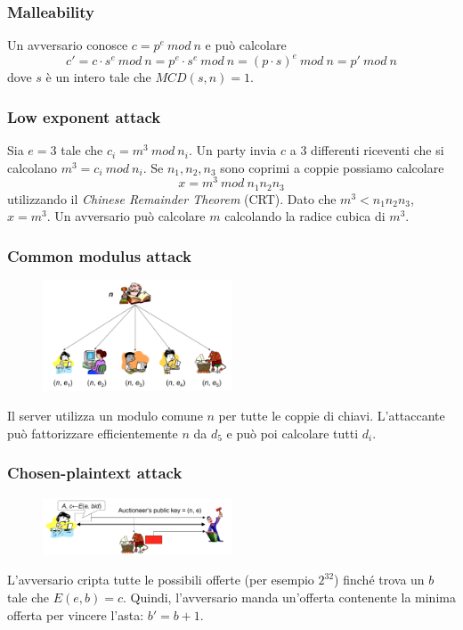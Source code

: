 \documentclass[a4paper,12pt]{article}
\begin{document}
\subsubsection{Malleability}
Un avversario conosce $c = p^e\ mod\ n$ e può calcolare
$$ c' = c \cdot s^e\ mod\ n = p^e \cdot s^e\ mod\ n = (p \cdot s)^e\ mod\ n = p'\ mod\ n $$
dove $s$ è un intero tale che $MCD(s, n) = 1$.

\subsubsection{Low exponent attack}
Sia $e = 3$ tale che $c_i = m^3\ mod\ n_i$.
Un party invia $c$ a 3 differenti riceventi che si calcolano $m^3 = c_i\ mod\ n_i$.
Se $n_1, n_2, n_3$ sono coprimi a coppie possiamo calcolare
$$ x = m^3\ mod\ n_1n_2n_3$$ 
utilizzando il \textit{Chinese Remainder Theorem} (CRT).
Dato che $m^3 < n_1n_2n_3$, $x = m^3$. Un avversario può calcolare $m$ calcolando la radice cubica di $m^3$.

\subsubsection{Common modulus attack}

\begin{figure}[H]
  \centering
  \includegraphics[width=0.5\textwidth]{img/common-modulus-attack}
\end{figure}
Il server utilizza un modulo comune $n$ per tutte le coppie di chiavi.
L'attaccante può fattorizzare efficientemente $n$ da $d_5$ e può poi calcolare tutti $d_i$.

\subsubsection{Chosen-plaintext attack}

\begin{figure}[H]
  \centering
  \includegraphics[width=0.5\textwidth]{img/chosen-plaintext-attack}
\end{figure}
L'avversario cripta tutte le possibili offerte (per esempio $2^{32}$) finché trova un $b$ tale che $E(e, b) = c$. Quindi, l'avversario manda un'offerta contenente la minima offerta per vincere l'asta: $b' = b + 1$.
\end{document}
